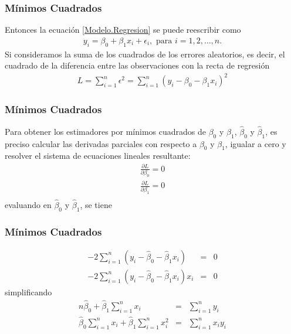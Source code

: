 \documentclass{beamer}
\begin{document}
\begin{frame}\frametitle{M\'inimos Cuadrados}
Entonces la ecuaci\'on \ref{Modelo.Regresion} se puede reescribir como
\begin{eqnarray}\label{Modelo.Regresion.dos}
y_{i}=\beta_{0}+\beta_{1}x_{i}+\epsilon_{i},\textrm{ para }i=1,2,\ldots,n.
\end{eqnarray}
Si consideramos la suma de los cuadrados de los errores aleatorios, es decir, el cuadrado de la diferencia entre las observaciones con la recta de regresi\'on
\begin{eqnarray}
L=\sum_{i=1}^{n}\epsilon^{2}=\sum_{i=1}^{n}\left(y_{i}-\beta_{0}-\beta_{1}x_{i}\right)^{2}
\end{eqnarray}
\end{frame}



\begin{frame}\frametitle{M\'inimos Cuadrados}
Para obtener los estimadores por m\'inimos cuadrados de $\beta_{0}$ y $\beta_{1}$, $\hat{\beta}_{0}$ y $\hat{\beta}_{1}$, es preciso calcular las derivadas parciales con respecto a $\beta_{0}$ y $\beta_{1}$, igualar a cero y resolver el sistema de ecuaciones lineales resultante:
\begin{eqnarray*}
\frac{\partial L}{\partial \beta_{0}}=0\\
\frac{\partial L}{\partial \beta_{1}}=0\\
\end{eqnarray*}
evaluando en $\hat{\beta}_{0}$ y $\hat{\beta}_{1}$, se tiene
\end{frame}
\begin{frame}\frametitle{M\'inimos Cuadrados}
\begin{eqnarray*}
-2\sum_{i=1}^{n}\left(y_{i}-\hat{\beta}_{0}-\hat{\beta}_{1}x_{i}\right)&=&0\\
-2\sum_{i=1}^{n}\left(y_{i}-\hat{\beta}_{0}-\hat{\beta}_{1}x_{i}\right)x_{i}&=&0
\end{eqnarray*}
simplificando
\begin{eqnarray*}
n\hat{\beta}_{0}+\hat{\beta}_{1}\sum_{i=1}^{n}x_{i}&=&\sum_{i=1}^{n}y_{i}\\
\hat{\beta}_{0}\sum_{i=1}^{n}x_{i}+\hat{\beta}_{1}\sum_{i=1}^{n}x_{i}^{2}&=&\sum_{i=1}^{n}x_{i}y_{i}
\end{eqnarray*}
\end{frame}
\end{document}
